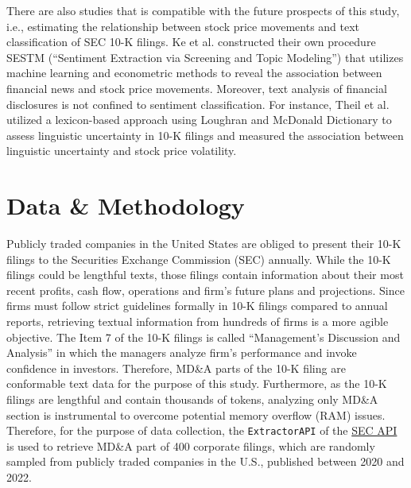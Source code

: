 \documentclass{article}
\begin{document}
\noindent There are also studies that is compatible with the future prospects of this study, i.e., estimating the relationship between stock price movements and text classification of SEC 10-K filings. Ke et al. constructed their own procedure SESTM (``Sentiment Extraction via Screening and Topic Modeling'') that utilizes machine learning and econometric methods to reveal the association between financial news and stock price movements. \cite{ke2019predicting} Moreover, text analysis of financial disclosures is not confined to sentiment classification. For instance, Theil et al. utilized a lexicon-based approach using Loughran and McDonald Dictionary to assess linguistic uncertainty in 10-K filings and measured the association between linguistic uncertainty and stock price volatility. \cite{theil2018word} \\

\section{Data \& Methodology}

Publicly traded companies in the United States are obliged to present their 10-K filings to the Securities Exchange Commission (SEC) annually. While the 10-K filings could be lengthful texts, those filings contain information about their most recent profits, cash flow, operations and firm's future plans and projections. Since firms must follow strict guidelines formally in 10-K filings compared to annual reports, retrieving textual information from hundreds of firms is a more agible objective. The Item 7 of the 10-K filings is called ``Management's Discussion and Analysis'' in which the managers analyze firm's performance and invoke confidence in investors. Therefore, MD\&A parts of the 10-K filing are conformable text data for the purpose of this study. Furthermore, as the 10-K filings are lengthful and contain thousands of tokens, analyzing only MD\&A section is instrumental to overcome potential memory overflow (RAM) issues. Therefore, for the purpose of data collection, the \texttt{ExtractorAPI} of the \href{https://sec-api.io/}{SEC API} is used to retrieve MD\&A part of 400 corporate filings, which are randomly sampled from publicly traded companies in the U.S., published between 2020 and 2022. \\
\end{document}
